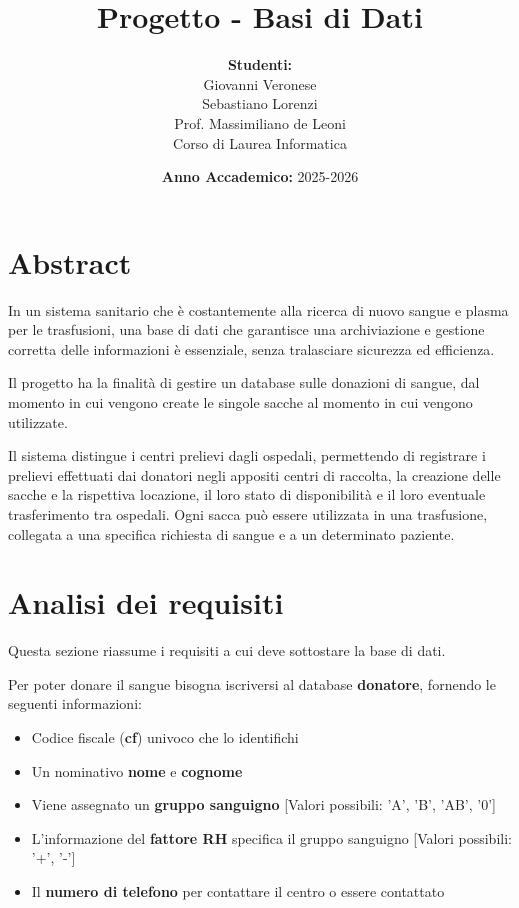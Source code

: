 \documentclass[10pt, a4paper]{article}
\title{
    \vspace{-2cm} %
    \fontsize{18pt}{22pt}\selectfont
    \textbf{Progetto - Basi di Dati}
}
\author{
    \large
    \textbf{Studenti:} \\ Giovanni Veronese \\ Sebastiano Lorenzi \\[2cm]
    \normalsize
    Prof. Massimiliano de Leoni \\[0.5cm]
    Corso di Laurea Informatica
}
\date{\textbf{Anno Accademico:} 2025-2026}
\begin{document}
\maketitle
\thispagestyle{empty}

\newpage

\tableofcontents
\thispagestyle{empty}

\newpage
\setcounter{page}{1} %

\section{Abstract}

In un sistema sanitario che è costantemente alla ricerca di nuovo sangue e plasma per le trasfusioni, una base di dati che garantisce una archiviazione e gestione corretta delle informazioni è essenziale, senza tralasciare sicurezza ed efficienza.

Il progetto ha la finalità di gestire un database sulle donazioni di sangue, dal momento in cui vengono create le singole sacche al momento in cui vengono utilizzate. 

Il sistema distingue i centri prelievi dagli ospedali, permettendo di registrare i prelievi effettuati dai donatori negli appositi centri di raccolta, la creazione delle sacche e la rispettiva locazione, il loro stato di disponibilità e il loro eventuale trasferimento tra ospedali. Ogni sacca può essere utilizzata in una trasfusione, collegata a una specifica richiesta di sangue e a un determinato paziente.

\section{Analisi dei requisiti}

Questa sezione riassume i requisiti a cui deve sottostare la base di dati.

Per poter donare il sangue bisogna iscriversi al database \textbf{donatore}, fornendo le seguenti informazioni:

\begin{itemize}
    \item Codice fiscale (\textbf{cf}) univoco che lo identifichi
    \item Un nominativo \textbf{nome} e \textbf{cognome}
    \item Viene assegnato un \textbf{gruppo sanguigno} [Valori possibili: 'A', 'B', 'AB', '0']
    \item L'informazione del \textbf{fattore RH} specifica il gruppo sanguigno [Valori possibili: '+', '-']
    \item Il \textbf{numero di telefono} per contattare il centro o essere contattato
\end{itemize}
\end{document}
